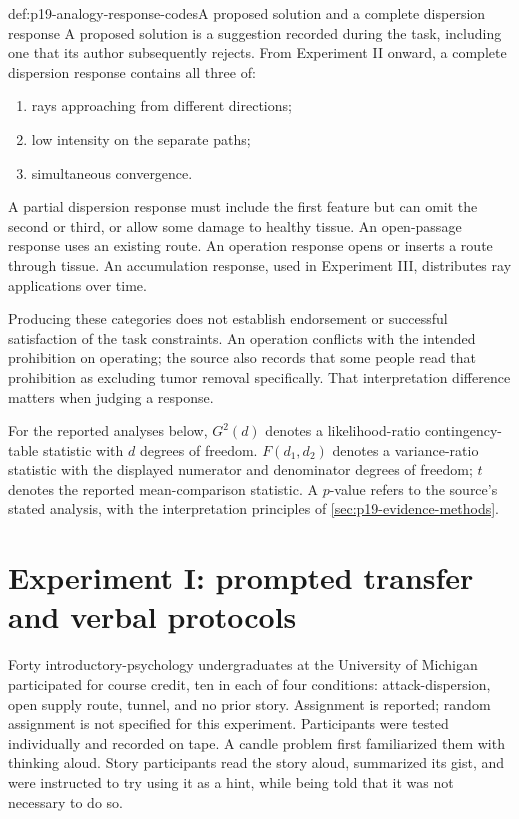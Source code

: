 \begin{hbdefinition}{def:p19-analogy-response-codes}{A proposed solution and a complete dispersion response}
A proposed solution is a suggestion recorded during
the task, including one that its author subsequently
rejects. From Experiment II onward, a complete
dispersion response contains all three of:
\begin{enumerate}
\item rays approaching from different directions;
\item low intensity on the separate paths;
\item simultaneous convergence.
\end{enumerate}
A partial dispersion response must include the first
feature but can omit the second or third, or allow
some damage to healthy tissue.
An open-passage response uses an existing route.
An operation response opens or inserts a route through
tissue. An accumulation response, used in Experiment
III, distributes ray applications over time.

Producing these categories does not establish endorsement
or successful satisfaction of the task constraints.
An operation conflicts with the intended prohibition
on operating; the source also records that some people
read that prohibition as excluding tumor removal
specifically. That interpretation difference matters
when judging a response.
\end{hbdefinition}

For the reported analyses below, \(G^2(d)\) denotes a
likelihood-ratio contingency-table statistic with \(d\)
degrees of freedom. \(F(d_1,d_2)\) denotes a variance-ratio
statistic with the displayed numerator and denominator
degrees of freedom; \(t\) denotes the reported mean-comparison
statistic. A \(p\)-value refers to the source's stated
analysis, with the interpretation principles of
\cref{sec:p19-evidence-methods}.

\section{Experiment I: prompted transfer and verbal protocols}
\label{sec:p19-analogy-experiment-one}

Forty introductory-psychology undergraduates at the University
of Michigan participated for course credit, ten in each
of four conditions: attack-dispersion, open supply route,
tunnel, and no prior story. Assignment is reported;
random assignment is not specified for this experiment.
Participants were tested individually and recorded on tape.
A candle problem first familiarized them with thinking aloud.
Story participants read the story aloud, summarized its gist,
and were instructed to try using it as a hint, while being
told that it was not necessary to do so.

